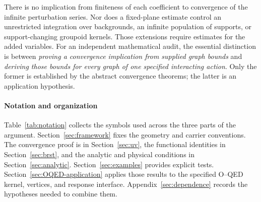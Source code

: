 \documentclass[final,5p,times,twocolumn,numbers,nopreprintline]{elsarticle}
\numberwithin{equation}{section}
\theoremstyle{definition}
\theoremstyle{remark}
\begin{document}
There is no implication from finiteness of each coefficient to
convergence of the infinite perturbation series. Nor does a fixed-plane
estimate control an unrestricted integration over backgrounds, an
infinite population of supports, or support-changing groupoid kernels.
Those extensions require estimates for the added variables. For an
independent mathematical audit, the essential distinction is between
\emph{proving a convergence implication from supplied graph bounds}
and \emph{deriving those bounds for every graph of one specified
interacting action}. Only the former is established by the abstract
convergence theorems; the latter is an application hypothesis.

\paragraph{Notation and organization}
Table~\ref{tab:notation} collects the symbols used across the three
parts of the argument. Section~\ref{sec:framework} fixes the geometry
and carrier conventions. The convergence proof is in
Section~\ref{sec:uv}, the functional identities in
Section~\ref{sec:brst}, and the analytic and physical conditions in
Section~\ref{sec:analytic}. Section~\ref{sec:examples} provides explicit
tests. Section~\ref{sec:OQED-application} applies those results to the
specified O--QED kernel, vertices, and response interface.
Appendix~\ref{sec:dependence} records the hypotheses needed to combine them.
\end{document}
